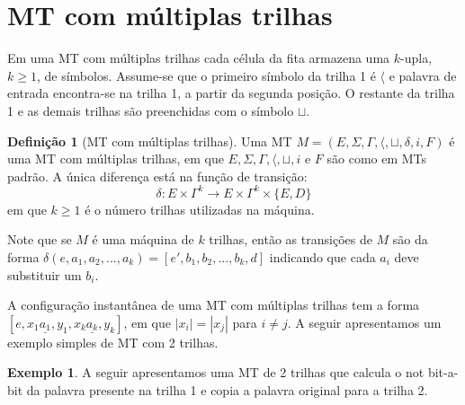 \documentclass[a4paper]{article}
\theoremstyle{definition}
\newtheorem{Example}{Exemplo}
\newtheorem{Definition}{Definição}
\begin{document}
  \section{MT com múltiplas trilhas}

  Em uma MT com múltiplas trilhas cada célula da fita armazena uma $k$-upla, $k
  \geq 1$, de símbolos. Assume-se que o primeiro símbolo da trilha 1 é $\langle$ 
  e palavra de entrada encontra-se na trilha 1, a partir da segunda posição. O 
  restante da trilha 1 e as demais trilhas são preenchidas com o símbolo $\sqcup$.

  \begin{Definition}[MT com múltiplas trilhas]
    Uma MT $M = (E,\Sigma, \Gamma, \langle, \sqcup, \delta, i, F)$ é uma MT
    com múltiplas trilhas, em que $E,\Sigma, \Gamma, \langle, \sqcup, i $ e $F$
    são como em MTs padrão. A única diferença está na função de transição:
    \[
      \delta : E \times \Gamma^k \to E \times \Gamma^k \times \{E,D\}
    \]
    em que $k\geq 1$ é o número trilhas utilizadas na máquina.
  \end{Definition}

  Note que se $M$ é uma máquina de $k$ trilhas, então as transições de $M$ são
  da forma $\delta(e,a_1,a_2,...,a_k) = [e', b_1,b_2,...,b_k,d]$ indicando que
  cada $a_i$ deve substituir um $b_i$.

  A configuração instantânea de uma MT com múltiplas trilhas tem a forma
  $[e, x_1\underline{a_1},y_1, x_k\underline{a_k},y_k]$, em que $|x_i| = |x_j|$
  para $i \neq j$. A seguir apresentamos um exemplo simples de MT com 2 trilhas.

  \begin{Example}
    A seguir apresentamos uma MT de 2 trilhas que calcula o not bit-a-bit da
    palavra presente na trilha 1 e copia a palavra original para a trilha 2.
    \begin{figure}[H]
      \centering
    \end{figure}    
  \end{Example}
\end{document}
